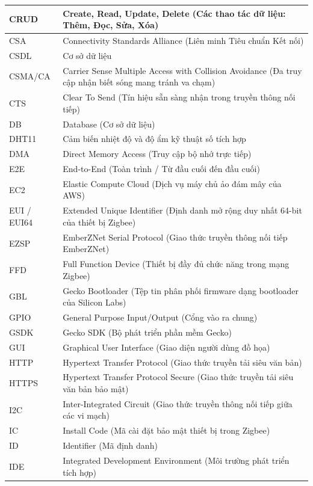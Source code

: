 \begin{longtable}{|l|p{12cm}|}
CRUD & Create, Read, Update, Delete (Các thao tác dữ liệu: Thêm, Đọc, Sửa, Xóa) \\ \hline
CSA & Connectivity Standards Alliance (Liên minh Tiêu chuẩn Kết nối) \\ \hline
CSDL & Cơ sở dữ liệu \\ \hline
CSMA/CA & Carrier Sense Multiple Access with Collision Avoidance (Đa truy cập nhận biết sóng mang tránh va chạm) \\ \hline
CTS & Clear To Send (Tín hiệu sẵn sàng nhận trong truyền thông nối tiếp) \\ \hline
DB & Database (Cơ sở dữ liệu) \\ \hline
DHT11 & Cảm biến nhiệt độ và độ ẩm kỹ thuật số tích hợp \\ \hline
DMA & Direct Memory Access (Truy cập bộ nhớ trực tiếp) \\ \hline
E2E & End-to-End (Toàn trình / Từ đầu cuối đến đầu cuối) \\ \hline
EC2 & Elastic Compute Cloud (Dịch vụ máy chủ ảo đám mây của AWS) \\ \hline
EUI / EUI64 & Extended Unique Identifier (Định danh mở rộng duy nhất 64-bit của thiết bị Zigbee) \\ \hline
EZSP & EmberZNet Serial Protocol (Giao thức truyền thông nối tiếp EmberZNet) \\ \hline
FFD & Full Function Device (Thiết bị đầy đủ chức năng trong mạng Zigbee) \\ \hline
GBL & Gecko Bootloader (Tệp tin phân phối firmware dạng bootloader của Silicon Labs) \\ \hline
GPIO & General Purpose Input/Output (Cổng vào ra chung) \\ \hline
GSDK & Gecko SDK (Bộ phát triển phần mềm Gecko) \\ \hline
GUI & Graphical User Interface (Giao diện người dùng đồ họa) \\ \hline
HTTP & Hypertext Transfer Protocol (Giao thức truyền tải siêu văn bản) \\ \hline
HTTPS & Hypertext Transfer Protocol Secure (Giao thức truyền tải siêu văn bản bảo mật) \\ \hline
I2C & Inter-Integrated Circuit (Giao thức truyền thông nối tiếp giữa các vi mạch) \\ \hline
IC & Install Code (Mã cài đặt bảo mật thiết bị trong Zigbee) \\ \hline
ID & Identifier (Mã định danh) \\ \hline
IDE & Integrated Development Environment (Môi trường phát triển tích hợp) \\ \hline

\end{longtable}
